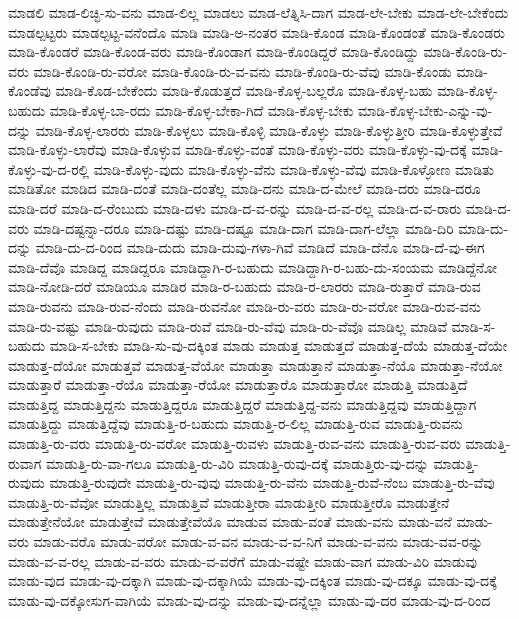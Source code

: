 {ಮಾಡಲಿ
ಮಾಡ-ಲಿಚ್ಛಿ-ಸು-ವನು
ಮಾಡ-ಲಿಲ್ಲ
ಮಾಡಲು
ಮಾಡ-ಲೆತ್ನಿಸಿ-ದಾಗ
ಮಾಡ-ಲೇ-ಬೇಕು
ಮಾಡ-ಲೇ-ಬೇಕೆಂದು
ಮಾಡಲ್ಪಟ್ಟರು
ಮಾಡಲ್ಪಟ್ಟ-ವನೆಂದೊ
ಮಾಡಿ
ಮಾಡಿ-ಅ-ನಂತರ
ಮಾಡಿ-ಕೊಂಡ
ಮಾಡಿ-ಕೊಂಡಂತೆ
ಮಾಡಿ-ಕೊಂಡರು
ಮಾಡಿ-ಕೊಂಡರೆ
ಮಾಡಿ-ಕೊಂಡ-ವರು
ಮಾಡಿ-ಕೊಂಡಾಗ
ಮಾಡಿ-ಕೊಂಡಿದ್ದರೆ
ಮಾಡಿ-ಕೊಂಡಿದ್ದು
ಮಾಡಿ-ಕೊಂಡಿ-ರು-ವರು
ಮಾಡಿ-ಕೊಂಡಿ-ರು-ವರೋ
ಮಾಡಿ-ಕೊಂಡಿ-ರು-ವ-ವನು
ಮಾಡಿ-ಕೊಂಡಿ-ರು-ವೆವು
ಮಾಡಿ-ಕೊಂಡು
ಮಾಡಿ-ಕೊಂಡೆವು
ಮಾಡಿ-ಕೊಡ-ಬೇಕೆಂದು
ಮಾಡಿ-ಕೊಡುತ್ತದೆ
ಮಾಡಿ-ಕೊಳ್ಳ-ಬಲ್ಲರೊ
ಮಾಡಿ-ಕೊಳ್ಳ-ಬಹು
ಮಾಡಿ-ಕೊಳ್ಳ-ಬಹುದು
ಮಾಡಿ-ಕೊಳ್ಳ-ಬಾ-ರದು
ಮಾಡಿ-ಕೊಳ್ಳ-ಬೇಕಾ-ಗಿದೆ
ಮಾಡಿ-ಕೊಳ್ಳ-ಬೇಕು
ಮಾಡಿ-ಕೊಳ್ಳ-ಬೇಕು-ಎನ್ನು-ವು-ದನ್ನು
ಮಾಡಿ-ಕೊಳ್ಳ-ಲಾರರು
ಮಾಡಿ-ಕೊಳ್ಳಲು
ಮಾಡಿ-ಕೊಳ್ಳಿ
ಮಾಡಿ-ಕೊಳ್ಳು
ಮಾಡಿ-ಕೊಳ್ಳುತ್ತೀರಿ
ಮಾಡಿ-ಕೊಳ್ಳುತ್ತೇವೆ
ಮಾಡಿ-ಕೊಳ್ಳು-ಲಾರೆವು
ಮಾಡಿ-ಕೊಳ್ಳುವ
ಮಾಡಿ-ಕೊಳ್ಳು-ವಂತೆ
ಮಾಡಿ-ಕೊಳ್ಳು-ವರು
ಮಾಡಿ-ಕೊಳ್ಳು-ವು-ದಕ್ಕೆ
ಮಾಡಿ-ಕೊಳ್ಳು-ವು-ದ-ರಲ್ಲಿ
ಮಾಡಿ-ಕೊಳ್ಳು-ವುದು
ಮಾಡಿ-ಕೊಳ್ಳು-ವೆನು
ಮಾಡಿ-ಕೊಳ್ಳು-ವೆವು
ಮಾಡಿ-ಕೊಳ್ಳೋಣ
ಮಾಡಿತು
ಮಾಡಿತೋ
ಮಾಡಿದ
ಮಾಡಿ-ದಂತೆ
ಮಾಡಿ-ದಂತೆಲ್ಲ
ಮಾಡಿ-ದನು
ಮಾಡಿ-ದ-ಮೇಲೆ
ಮಾಡಿ-ದರು
ಮಾಡಿ-ದರೂ
ಮಾಡಿ-ದರೆ
ಮಾಡಿ-ದ-ರೆಂಬುದು
ಮಾಡಿ-ದಳು
ಮಾಡಿ-ದ-ವ-ರನ್ನು
ಮಾಡಿ-ದ-ವ-ರಲ್ಲ
ಮಾಡಿ-ದ-ವ-ರಾರು
ಮಾಡಿ-ದ-ವರು
ಮಾಡಿ-ದಷ್ಟನ್ನಾ-ದರೂ
ಮಾಡಿ-ದಷ್ಟು
ಮಾಡಿ-ದಷ್ಟೂ
ಮಾಡಿ-ದಾಗ
ಮಾಡಿ-ದಾಗ-ಲೆಲ್ಲಾ
ಮಾಡಿ-ದಿರಿ
ಮಾಡಿ-ದು-ದನ್ನು
ಮಾಡಿ-ದು-ದ-ರಿಂದ
ಮಾಡಿ-ದುದು
ಮಾಡಿ-ದುವು-ಗಳಾ-ಗಿವೆ
ಮಾಡಿದೆ
ಮಾಡಿ-ದೆನೊ
ಮಾಡಿ-ದೆ-ವು-ಈಗ
ಮಾಡಿ-ದೆವೊ
ಮಾಡಿದ್ದ
ಮಾಡಿದ್ದರೂ
ಮಾಡಿದ್ದಾಗಿ-ರ-ಬಹುದು
ಮಾಡಿದ್ದಾಗಿ-ರ-ಬಹು-ದು-ಸಂಯಮ
ಮಾಡಿದ್ದೆನೋ
ಮಾಡಿ-ನೋಡಿ-ದರೆ
ಮಾಡಿಯೂ
ಮಾಡಿರ
ಮಾಡಿ-ರ-ಬಹುದು
ಮಾಡಿ-ರ-ಲಾರರು
ಮಾಡಿ-ರುತ್ತಾರೆ
ಮಾಡಿ-ರುವ
ಮಾಡಿ-ರುವನು
ಮಾಡಿ-ರುವ-ನೆಂದು
ಮಾಡಿ-ರುವನೋ
ಮಾಡಿ-ರು-ವರು
ಮಾಡಿ-ರು-ವರೋ
ಮಾಡಿ-ರುವ-ವನು
ಮಾಡಿ-ರು-ವಷ್ಟು
ಮಾಡಿ-ರುವುದು
ಮಾಡಿ-ರುವೆ
ಮಾಡಿ-ರು-ವೆವು
ಮಾಡಿ-ರು-ವೆವೊ
ಮಾಡಿಲ್ಲ
ಮಾಡಿವೆ
ಮಾಡಿ-ಸ-ಬಹುದು
ಮಾಡಿ-ಸ-ಬೇಕು
ಮಾಡಿ-ಸು-ವು-ದಕ್ಕಿಂತ
ಮಾಡು
ಮಾಡುತ್ತ
ಮಾಡುತ್ತದೆ
ಮಾಡುತ್ತ-ದೆಯೆ
ಮಾಡುತ್ತ-ದೆಯೇ
ಮಾಡುತ್ತ-ದೆಯೋ
ಮಾಡುತ್ತವೆ
ಮಾಡುತ್ತ-ವೆಯೋ
ಮಾಡುತ್ತಾ
ಮಾಡುತ್ತಾನೆ
ಮಾಡುತ್ತಾ-ನೆಯೊ
ಮಾಡುತ್ತಾ-ನೆಯೋ
ಮಾಡುತ್ತಾರೆ
ಮಾಡುತ್ತಾ-ರೆಯೊ
ಮಾಡುತ್ತಾ-ರೆಯೋ
ಮಾಡುತ್ತಾರೊ
ಮಾಡುತ್ತಾರೋ
ಮಾಡುತ್ತಿ
ಮಾಡುತ್ತಿದೆ
ಮಾಡುತ್ತಿದ್ದ
ಮಾಡುತ್ತಿದ್ದನು
ಮಾಡುತ್ತಿದ್ದರೂ
ಮಾಡುತ್ತಿದ್ದರೆ
ಮಾಡುತ್ತಿದ್ದ-ವನು
ಮಾಡುತ್ತಿದ್ದವು
ಮಾಡುತ್ತಿದ್ದಾಗ
ಮಾಡುತ್ತಿದ್ದು
ಮಾಡುತ್ತಿದ್ದೆವು
ಮಾಡುತ್ತಿ-ರ-ಬಹುದು
ಮಾಡುತ್ತಿ-ರ-ಲಿಲ್ಲ
ಮಾಡುತ್ತಿ-ರುವ
ಮಾಡುತ್ತಿ-ರುವನು
ಮಾಡುತ್ತಿ-ರು-ವರು
ಮಾಡುತ್ತಿ-ರು-ವರೋ
ಮಾಡುತ್ತಿ-ರುವಳು
ಮಾಡುತ್ತಿ-ರುವ-ವನು
ಮಾಡುತ್ತಿ-ರುವ-ವರು
ಮಾಡುತ್ತಿ-ರುವಾಗ
ಮಾಡುತ್ತಿ-ರು-ವಾ-ಗಲೂ
ಮಾಡುತ್ತಿ-ರು-ವಿರಿ
ಮಾಡುತ್ತಿ-ರುವು-ದಕ್ಕೆ
ಮಾಡುತ್ತಿರು-ವು-ದನ್ನು
ಮಾಡುತ್ತಿ-ರುವುದು
ಮಾಡುತ್ತಿ-ರುವುದೇ
ಮಾಡುತ್ತಿ-ರು-ವುವು
ಮಾಡುತ್ತಿ-ರು-ವೆನು
ಮಾಡುತ್ತಿ-ರುವೆ-ನೆಂಬ
ಮಾಡುತ್ತಿ-ರು-ವೆವು
ಮಾಡುತ್ತಿ-ರು-ವೆವೋ
ಮಾಡುತ್ತಿಲ್ಲ
ಮಾಡುತ್ತಿವೆ
ಮಾಡುತ್ತೀರಾ
ಮಾಡುತ್ತೀರಿ
ಮಾಡುತ್ತೀರೊ
ಮಾಡುತ್ತೇನೆ
ಮಾಡುತ್ತೇನೆಯೋ
ಮಾಡುತ್ತೇವೆ
ಮಾಡುತ್ತೇವೆಯೊ
ಮಾಡುವ
ಮಾಡು-ವಂತೆ
ಮಾಡು-ವನು
ಮಾಡು-ವನೆ
ಮಾಡು-ವರು
ಮಾಡು-ವರೊ
ಮಾಡು-ವರೋ
ಮಾಡು-ವ-ವನ
ಮಾಡು-ವ-ವ-ನಿಗೆ
ಮಾಡು-ವ-ವನು
ಮಾಡು-ವವ-ರನ್ನು
ಮಾಡು-ವ-ವ-ರಲ್ಲ
ಮಾಡು-ವ-ವರು
ಮಾಡು-ವ-ವರೆಗೆ
ಮಾಡು-ವಷ್ಟೇ
ಮಾಡು-ವಾಗ
ಮಾಡು-ವಿರಿ
ಮಾಡುವು
ಮಾಡು-ವುದ
ಮಾಡು-ವು-ದಕ್ಕಾಗಿ
ಮಾಡು-ವು-ದಕ್ಕಾಗಿಯೆ
ಮಾಡು-ವು-ದಕ್ಕಿಂತ
ಮಾಡು-ವು-ದಕ್ಕೂ
ಮಾಡು-ವು-ದಕ್ಕೆ
ಮಾಡು-ವು-ದಕ್ಕೋಸುಗ-ವಾಗಿಯೆ
ಮಾಡು-ವು-ದನ್ನು
ಮಾಡು-ವು-ದನ್ನೆಲ್ಲಾ
ಮಾಡು-ವು-ದರ
ಮಾಡು-ವು-ದ-ರಿಂದ
}
